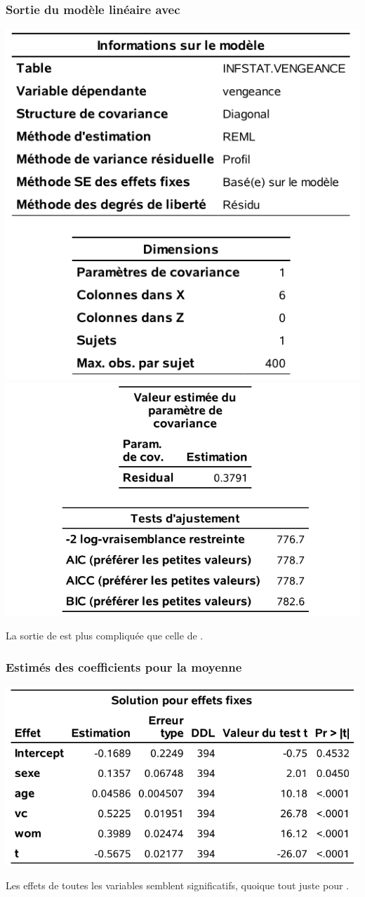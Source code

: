 \documentclass{beamer}
\begin{document}
 \begin{frame}
\frametitle{Sortie du modèle linéaire avec }
\begin{center}
\includegraphics[width = 0.45\linewidth]{img/c5/diapos6-e03}
\includegraphics[width = 0.5\linewidth]{img/c5/diapos6-e04}
\end{center}
{\footnotesize La sortie de  est plus compliquée que celle de .


}

\end{frame}
\begin{frame}
\frametitle{Estimés des coefficients pour la moyenne}
\begin{center}
\includegraphics[width = 0.7\linewidth]{img/c5/diapos6-e05}
\end{center}
Les effets de toutes les variables semblent significatifs, quoique tout juste pour .
\end{frame}
\end{document}
